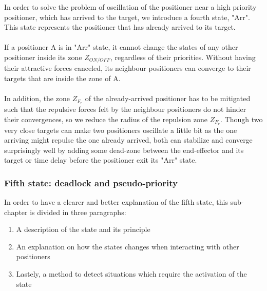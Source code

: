 \documentclass[]{spie}  %
\begin{document}
	In order to solve the problem of oscillation of the positioner near a high priority positioner, which has arrived to the target, we introduce a fourth state, "Arr". This state represents the positioner that has already arrived to its target. \\\\
	If a positioner A is in "Arr" state, it cannot change the states of any other positioner inside its zone $Z_{ON/OFF}$, regardless of their priorities. 
	Without having their attractive forces canceled, its neighbour positioners can converge to their targets that are inside the zone of A.\\\\
	In addition, the zone $Z_{F_{r}}$ of the already-arrived positioner has to be mitigated such that the repulsive forces felt by the neighbour positioners do not hinder their convergences, so we reduce the radius of the repulsion zone $Z_{F_{r}}$. Though two very close targets can make two positioners oscillate a little bit as the one arriving might repulse the one already arrived, both can stabilize and converge surprisingly well by adding some dead-zone between the end-effector and its target or time delay before the positioner exit its "Arr" state.  
	
	\subsubsection{Fifth state: deadlock and pseudo-priority}
	\label{sub_chapter_fifth_state}
	In order to have a clearer and better explanation of the fifth state, this sub-chapter is divided in three paragraphs: 
	\begin{enumerate}
		\item A description of the state and its principle 
		\item An explanation on how the states changes when interacting with other positioners
		\item Lastely, a method to detect situations which require the activation of the state
	\end{enumerate}
	
\end{document}
